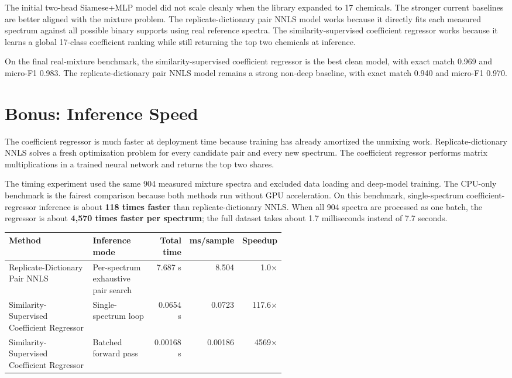 \documentclass[11pt]{article}
\begin{document}
The initial two-head Siamese+MLP model did not scale cleanly when the library expanded to 17 chemicals. The stronger current baselines are better aligned with the mixture problem. The replicate-dictionary pair NNLS model works because it directly fits each measured spectrum against all possible binary supports using real reference spectra. The similarity-supervised coefficient regressor works because it learns a global 17-class coefficient ranking while still returning the top two chemicals at inference.

On the final real-mixture benchmark, the similarity-supervised coefficient regressor is the best clean model, with exact match 0.969 and micro-F1 0.983. The replicate-dictionary pair NNLS model remains a strong non-deep baseline, with exact match 0.940 and micro-F1 0.970.

\section*{Bonus: Inference Speed}

The coefficient regressor is much faster at deployment time because training has already amortized the unmixing work. Replicate-dictionary NNLS solves a fresh optimization problem for every candidate pair and every new spectrum. The coefficient regressor performs matrix multiplications in a trained neural network and returns the top two shares.

The timing experiment used the same 904 measured mixture spectra and excluded data loading and deep-model training. The CPU-only benchmark is the fairest comparison because both methods run without GPU acceleration. On this benchmark, single-spectrum coefficient-regressor inference is about \textbf{118 times faster} than replicate-dictionary NNLS. When all 904 spectra are processed as one batch, the regressor is about \textbf{4,570 times faster per spectrum}; the full dataset takes about 1.7 milliseconds instead of 7.7 seconds.

\begin{center}
\begin{tabular}{p{0.32\linewidth}p{0.23\linewidth}rrr}
\toprule
\textbf{Method} & \textbf{Inference mode} & \textbf{Total time} & \textbf{ms/sample} & \textbf{Speedup} \\
\midrule
Replicate-Dictionary Pair NNLS & Per-spectrum exhaustive pair search & 7.687 s & 8.504 & 1.0$\times$ \\
Similarity-Supervised Coefficient Regressor & Single-spectrum loop & 0.0654 s & 0.0723 & 117.6$\times$ \\
Similarity-Supervised Coefficient Regressor & Batched forward pass & 0.00168 s & 0.00186 & 4569$\times$ \\
\bottomrule
\end{tabular}
\end{center}
\end{document}
